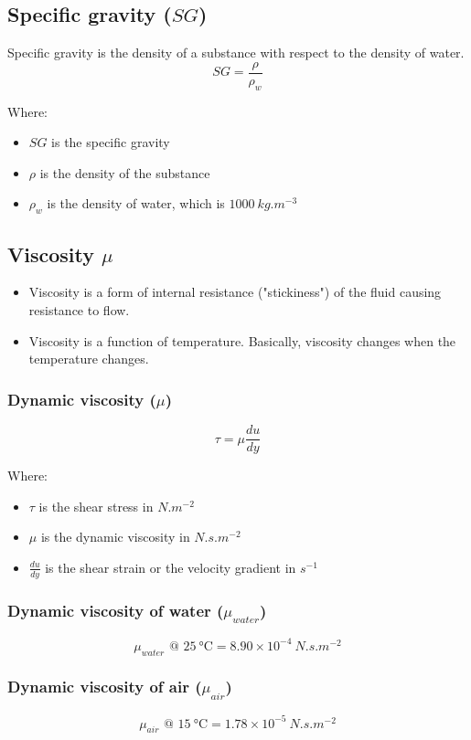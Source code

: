 \documentclass[11pt]{article}
\begin{document}
\subsection{Specific gravity (\(SG\))}
\label{sec:org8ad574d}
Specific gravity is the density of a substance with respect to the density of water.
\[SG = \frac{\rho}{\rho_w}\]

Where:
\begin{itemize}
\item \(SG\) is the specific gravity
\item \(\rho\) is the density of the substance
\item \(\rho_w\) is the density of water, which is \(\qty{1000}{kg.m^{-3}}\)
\end{itemize}
\subsection{Viscosity \(\mu\)}
\label{sec:orgdcf5ac3}
\begin{itemize}
\item Viscosity is a form of internal resistance ("stickiness") of the fluid causing resistance to flow.
\item Viscosity is a function of temperature. Basically, viscosity changes when the temperature changes.
\end{itemize}
\subsubsection{Dynamic viscosity (\(\mu\))}
\label{sec:org449ffce}
\[\tau = \mu \frac{du}{dy}\]

Where:
\begin{itemize}
\item \(\tau\) is the shear stress in \(\unit{N.m^{-2}}\)
\item \(\mu\) is the dynamic viscosity in \(\unit{N.s.m^{-2}}\)
\item \(\frac{du}{dy}\) is the shear strain or the velocity gradient in \(\unit{s^{-1}}\)
\end{itemize}
\subsubsection{Dynamic viscosity of water (\(\mu_{water}\))}
\label{sec:org47f848c}
\[\mu_{water} \text{ @ } \qty{25}{\degreeCelsius} = 8.90 \times 10^{-4} \ \unit{N.s.m^{-2}}\]
\subsubsection{Dynamic viscosity of air (\(\mu_{air}\))}
\label{sec:orgeb950af}
\[\mu_{air} \text{ @ } \qty{15}{\degreeCelsius} = 1.78 \times 10^{-5} \ \unit{N.s.m^{-2}}\]
\end{document}
